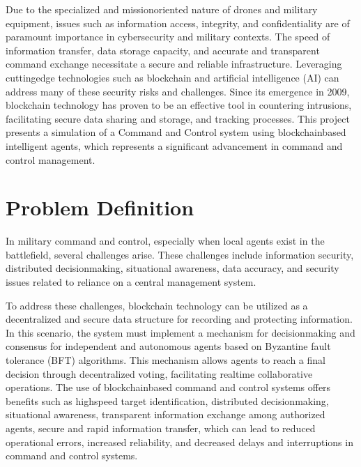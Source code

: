 \documentclass[a4paper,10pt,english]{sphinxmanual}
\let\sphinxpxdimen\pdfpxdimen\else\newdimen\sphinxpxdimen
\begin{document}
\noindent{\hspace*{\fill}\sphinxincludegraphics[width=600\sphinxpxdimen]{{albertQube}.jpg}\hspace*{\fill}}

\sphinxAtStartPar
Due to the specialized and mission\sphinxhyphen{}oriented nature of drones and military equipment, issues such as information access, integrity, and confidentiality are of paramount importance in cybersecurity and military contexts. The speed of information transfer, data storage capacity, and accurate and transparent command exchange necessitate a secure and reliable infrastructure. Leveraging cutting\sphinxhyphen{}edge technologies such as blockchain and artificial intelligence (AI) can address many of these security risks and challenges. Since its emergence in 2009, blockchain technology has proven to be an effective tool in countering intrusions, facilitating secure data sharing and storage, and tracking processes. This project presents a simulation of a Command and Control system using blockchain\sphinxhyphen{}based intelligent agents, which represents a significant advancement in command and control management.


\section{Problem Definition}
\label{\detokenize{overview:problem-definition}}
\sphinxAtStartPar
In military command and control, especially when local agents exist in the battlefield, several challenges arise. These challenges include information security, distributed decision\sphinxhyphen{}making, situational awareness, data accuracy, and security issues related to reliance on a central management system.

\sphinxAtStartPar
To address these challenges, blockchain technology can be utilized as a decentralized and secure data structure for recording and protecting information. In this scenario, the system must implement a mechanism for decision\sphinxhyphen{}making and consensus for independent and autonomous agents based on Byzantine fault tolerance (BFT) algorithms. This mechanism allows agents to reach a final decision through decentralized voting, facilitating real\sphinxhyphen{}time collaborative operations. The use of blockchain\sphinxhyphen{}based command and control systems offers benefits such as high\sphinxhyphen{}speed target identification, distributed decision\sphinxhyphen{}making, situational awareness, transparent information exchange among authorized agents, secure and rapid information transfer, which can lead to reduced operational errors, increased reliability, and decreased delays and interruptions in command and control systems.
\end{document}
